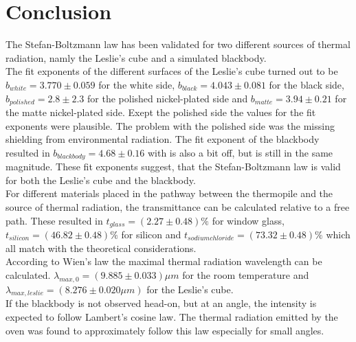 \section{Conclusion}

\noindent
The Stefan-Boltzmann law has been validated for two different sources of thermal radiation, namly the Leslie's cube and a simulated blackbody.\\
The fit exponents of the different surfaces of the Leslie's cube turned out to be $b_{white} = 3.770 \pm 0.059$ for the white side,
$b_{black} = 4.043 \pm 0.081$ for the black side, $b_{polished} = 2.8 \pm 2.3$ for the polished nickel-plated side and $b_{matte} = 3.94 \pm 0.21$ for
the matte nickel-plated side. Exept the polished side the values for the fit exponents were plausible. The problem with the polished side was the missing
shielding from environmental radiation. The fit exponent of the blackbody resulted in $b_{blackbody} = 4.68 \pm 0.16$ with is also a bit off, but is still in
the same magnitude. These fit exponents suggest, that the Stefan-Boltzmann law is valid for both the Leslie's cube and the blackbody. \\

For different materials placed in the pathway between the thermopile and the source of thermal radiation, the transmittance can be calculated relative to
a free path. These resulted in $t_{glass} = (2.27 \pm 0.48)\%$ for window glass, $t_{silicon} = (46.82 \pm 0.48)\%$ for silicon and 
$t_{sodium chloride} = (73.32 \pm 0.48)\%$ which all match with the theoretical considerations. \\
According to Wien's law the maximal thermal radiation wavelength can be calculated. $\lambda_{max,0} = (9.885 \pm 0.033) \mu m$ for the room temperature
and $\lambda_{max,leslie} = (8.276 \pm 0.020 \mu m)$ for the Leslie's cube. \\
If the blackbody is not observed head-on, but at an angle, the intensity is expected to follow Lambert's cosine law. The thermal radiation emitted by the
oven was found to approximately follow this law especially for small angles.
